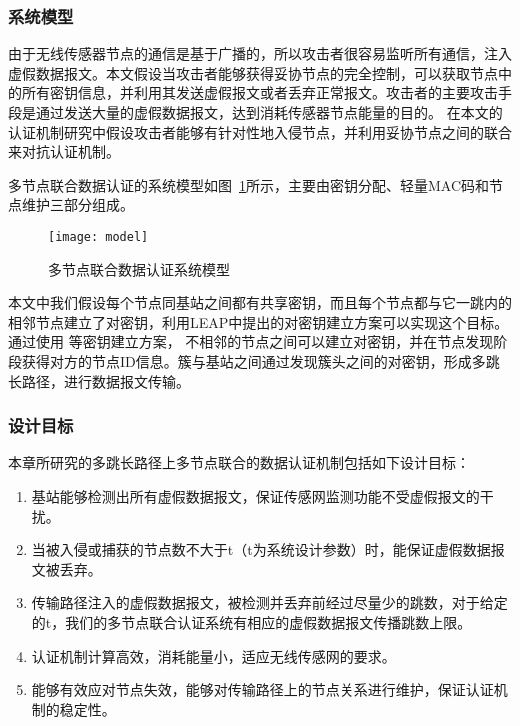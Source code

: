\subsubsection{系统模型}
由于无线传感器节点的通信是基于广播的，所以攻击者很容易监听所有通信，注入虚假数据报文。本文假设当攻击者能够获得妥协节点的完全控制，可以获取节点中的所有密钥信息，并利用其发送虚假报文或者丢弃正常报文。攻击者的主要攻击手段是通过发送大量的虚假数据报文，达到消耗传感器节点能量的目的。
在本文的认证机制研究中假设攻击者能够有针对性地入侵节点，并利用妥协节点之间的联合来对抗认证机制。

多节点联合数据认证的系统模型如图~\ref{fig:model}所示，主要由密钥分配、轻量MAC码和节点维护三部分组成。
\begin{figure}[htbp]
  \centering
  \texttt{[image: model]}
  \caption{多节点联合数据认证系统模型}
  \label{fig:model}
\end{figure}



本文中我们假设每个节点同基站之间都有共享密钥，而且每个节点都与它一跳内的相邻节点建立了对密钥，利用LEAP中提出的对密钥建立方案可以实现这个目标。
通过使用 等密钥建立方案，
不相邻的节点之间可以建立对密钥，并在节点发现阶段获得对方的节点ID信息。簇与基站之间通过发现簇头之间的对密钥，形成多跳长路径，进行数据报文传输。


\subsubsection{设计目标}
本章所研究的多跳长路径上多节点联合的数据认证机制包括如下设计目标：
\begin{enumerate}\setlength{\itemsep}{-\itemsep}
  \item 基站能够检测出所有虚假数据报文，保证传感网监测功能不受虚假报文的干扰。
  \item 当被入侵或捕获的节点数不大于t（t为系统设计参数）时，能保证虚假数据报文被丢弃。
  \item 传输路径注入的虚假数据报文，被检测并丢弃前经过尽量少的跳数，对于给定的t，我们的多节点联合认证系统有相应的虚假数据报文传播跳数上限。
  \item 认证机制计算高效，消耗能量小，适应无线传感网的要求。
  \item 能够有效应对节点失效，能够对传输路径上的节点关系进行维护，保证认证机制的稳定性。
\end{enumerate}

